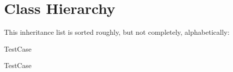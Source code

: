 \section{Class Hierarchy}
This inheritance list is sorted roughly, but not completely, alphabetically\+:\begin{DoxyCompactList}
\item {}
\item Test\+Case\begin{DoxyCompactList}
\item {}
\end{DoxyCompactList}
\item Test\+Case\begin{DoxyCompactList}
\item {}
\end{DoxyCompactList}
\end{DoxyCompactList}
